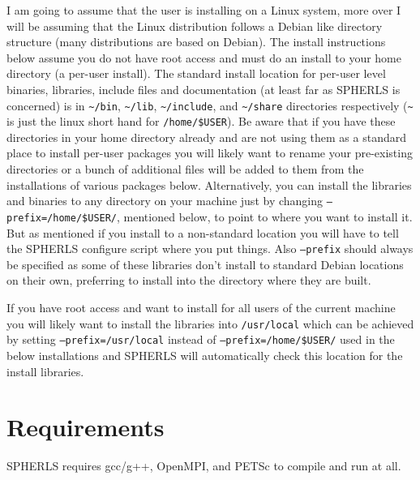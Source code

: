 \documentclass[12pt,a4paper]{book}
\begin{document}
I am going to assume that the user is installing on a Linux system, more over I will be assuming that the Linux distribution follows a Debian like directory structure (many distributions are based on Debian). The install instructions below assume you do not have root access and must do an install to your home directory (a per-user install). The standard install location for per-user level binaries, libraries, include files and documentation (at least far as SPHERLS is concerned) is in {\tt \textasciitilde/bin}, {\tt \textasciitilde/lib}, {\tt \textasciitilde/include}, and {\tt \textasciitilde/share} directories respectively ({\tt \textasciitilde} is just the linux short hand for {\tt /home/\-\$USER}). Be aware that if you have these directories in your home directory already and are not using them as a standard place to install per-user packages you will likely want to rename your pre-existing directories or a bunch of additional files will be added to them from the installations of various packages below. Alternatively, you can install the libraries and binaries to any directory on your machine just by changing {\tt --prefix\-=/home/\-\$USER/}, mentioned below, to point to where you want to install it. But as mentioned if you install to a non-standard location you will have to tell the SPHERLS configure script where you put things. Also {\tt --prefix} should always be specified as some of these libraries don't install to standard Debian locations on their own, preferring to install into the directory where they are built.

If you have root access and want to install for all users of the current machine you will likely want to install the libraries into {\tt /usr/\-local}  which can be achieved by setting {\tt --prefix=/usr/local} instead of {\tt --prefix\-=/home/\-\$USER/} used in the below installations and SPHERLS will automatically check this location for the install libraries.
    
\section{Requirements}
SPHERLS requires gcc/g++, OpenMPI, and PETSc to compile and run at all.
\end{document}
